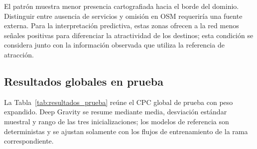 \begin{table}[htbp]
\centering
\scriptsize
\renewcommand{\arraystretch}{1.12}
\caption{Presencia de atributos OSM y distancia al centroide del área de estudio. ``Interior/periferia'' compara el 75\% de unidades más cercanas con el cuartil más distante dentro de cada representación; $\rho$ es la correlación de Spearman con la distancia. Fuente: elaboración propia a partir de los atributos físicos de la configuración principal.}
\label{tab:cobertura_atributos_osm}
\end{table}

El patrón muestra menor presencia cartografiada hacia el borde del dominio. Distinguir entre ausencia de servicios y omisión en OSM requeriría una fuente externa. Para la interpretación predictiva, estas zonas ofrecen a la red menos señales positivas para diferenciar la atractividad de los destinos; esta condición se considera junto con la información observada que utiliza la referencia de atracción.

\subsection{Resultados globales en prueba}
\label{sec:resultados_globales_prueba}

La Tabla~\ref{tab:resultados_prueba} reúne el CPC global de prueba con peso expandido. Deep Gravity se resume mediante media, desviación estándar muestral y rango de las tres inicializaciones; los modelos de referencia son deterministas y se ajustan solamente con los flujos de entrenamiento de la rama correspondiente.


